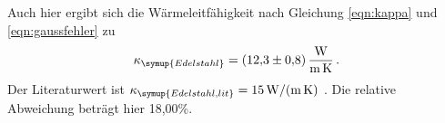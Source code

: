 Auch hier ergibt sich die Wärmeleitfähigkeit nach Gleichung \eqref{eqn:kappa}
und \eqref{eqn:gaussfehler} zu
\begin{align}
  \kappa_{\symup{Edelstahl}} = \SI{12.3(08)}{\watt\per\meter\per\kelvin}\,.\nonumber
\end{align}
Der Literaturwert ist $\kappa_{\symup{Edelstahl,lit}} = \SI{15}{\watt\per\meter\per\kelvin}$
\cite{Wärmeleitfähigkeit3}.
Die relative Abweichung beträgt hier 18,00\%.
